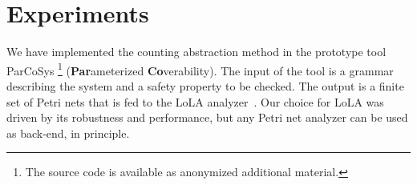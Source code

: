 \newcommand{\toolrepo}{\mycomment{Neven}{REPO}}
\newcommand{\toolname}{ParCoSys}
\newcommand{\toolnameexplanation}{(\textbf{Par}ameterized \textbf{Co}verability)}

\section{Experiments}

We have implemented the counting abstraction method in the prototype
tool \toolname{}
\footnote{The source code is available as anonymized additional
  material.} \toolnameexplanation{}. The input of the tool is a
grammar describing the system and a safety property to be checked. The
output is a finite set of Petri nets that is fed to the LoLA
analyzer~\cite{lola}. Our choice for LoLA was driven by its robustness
and performance, but any Petri net analyzer can be used as back-end,
in principle.



